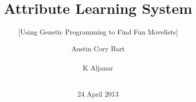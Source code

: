 \documentclass{acm_proc_article-sp}
\begin{document}
\title{Attribute Learning System}
\subtitle{[Using Genetic Programming to Find Fun Movelists]} %
%
%
%
%
%

%
\author{
%
%
\alignauthor
Austin Cory Bart\\
       \\
\alignauthor
K Aljanar\\
       \\
\alignauthor
}
\date{24 April 2013}
\end{document}
